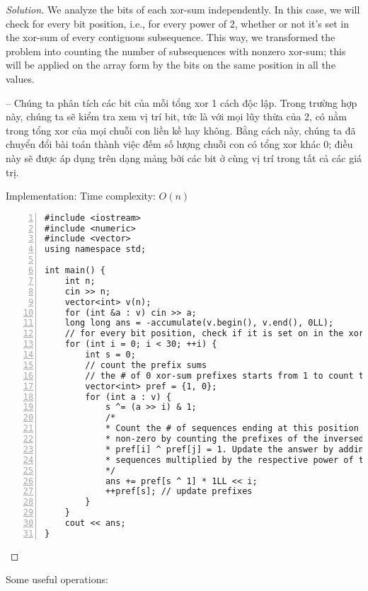 \documentclass{article}
\begin{document}
\begin{proof}[Solution]
    We analyze the bits of each xor-sum independently. In this case, we will check for every bit position, i.e., for every power of 2, whether or not it's set in the xor-sum of every contiguous subsequence. This way, we transformed the problem into counting the number of subsequences with nonzero xor-sum; this will be applied on the array form by the bits on the same position in all the values.

    -- Chúng ta phân tích các bit của mỗi tổng xor 1 cách độc lập. Trong trường hợp này, chúng ta sẽ kiểm tra xem vị trí bit, tức là với mọi lũy thừa của 2, có nằm trong tổng xor của mọi chuỗi con liền kề hay không. Bằng cách này, chúng ta đã chuyển đổi bài toán thành việc đếm số lượng chuỗi con có tổng xor khác 0; điều này sẽ được áp dụng trên dạng mảng bởi các bit ở cùng vị trí trong tất cả các giá trị.

    Implementation: Time complexity: $O(n)$
    \begin{Verbatim}[numbers=left,xleftmargin=5mm]
#include <iostream>
#include <numeric>
#include <vector>
using namespace std;

int main() {
    int n;
    cin >> n;
    vector<int> v(n);
    for (int &a : v) cin >> a;
    long long ans = -accumulate(v.begin(), v.end(), 0LL);
    // for every bit position, check if it is set on in the xor-sum of every subsequence
    for (int i = 0; i < 30; ++i) {
        int s = 0;
        // count the prefix sums
        // the # of 0 xor-sum prefixes starts from 1 to count the prefixes with xor-sum 1
        vector<int> pref = {1, 0};
        for (int a : v) {
            s ^= (a >> i) & 1;
            /*
            * Count the # of sequences ending at this position with xor-sum
            * non-zero by counting the prefixes of the inversed bit, i.e.
            * pref[i] ^ pref[j] = 1. Update the answer by adding the # of such
            * sequences multiplied by the respective power of two.
            */
            ans += pref[s ^ 1] * 1LL << i;
            ++pref[s]; // update prefixes
        }
    }
    cout << ans;
}
    \end{Verbatim}
\end{proof}
Some useful operations:
\end{document}
